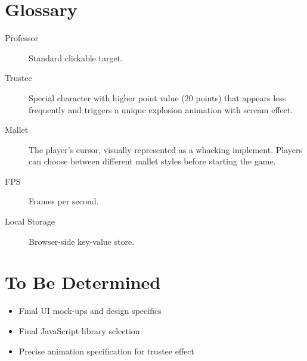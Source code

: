 \documentclass[11pt]{scrreprt}
\begin{document}
\chapter{Glossary}
\begin{description}
  \item[Professor] Standard clickable target.
  \item[Trustee] Special character with higher point value (20 points) that appears less frequently and triggers a unique explosion animation with scream effect.
  \item[Mallet] The player's cursor, visually represented as a whacking implement. Players can choose between different mallet styles before starting the game.
  \item[FPS] Frames per second.
  \item[Local Storage] Browser-side key-value store.
\end{description}


\chapter{To Be Determined}
\begin{itemize}
  \item Final UI mock-ups and design specifics
  \item Final JavaScript library selection
  \item Precise animation specification for trustee effect
\end{itemize}
\end{document}
